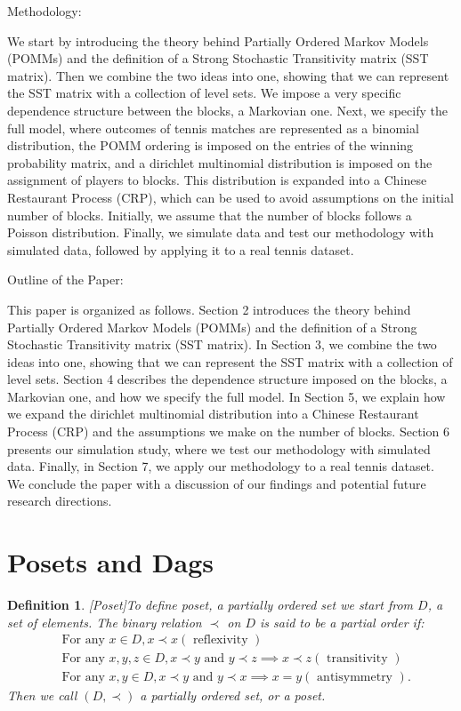 \documentclass[11pt]{amsart}
\newtheorem{definition}{Definition}
\begin{document}
Methodology:

We start by introducing the theory behind Partially Ordered Markov Models (POMMs) and the definition of a Strong Stochastic Transitivity matrix (SST matrix). Then we combine the two ideas into one, showing that we can represent the SST matrix with a collection of level sets. We impose a very specific dependence structure between the blocks, a Markovian one. Next, we specify the full model, where outcomes of tennis matches are represented as a binomial distribution, the POMM ordering is imposed on the entries of the winning probability matrix, and a dirichlet multinomial distribution is imposed on the assignment of players to blocks. This distribution is expanded into a Chinese Restaurant Process (CRP), which can be used to avoid assumptions on the initial number of blocks. Initially, we assume that the number of blocks follows a Poisson distribution. Finally, we simulate data and test our methodology with simulated data, followed by applying it to a real tennis dataset.

Outline of the Paper:

This paper is organized as follows. Section 2 introduces the theory behind Partially Ordered Markov Models (POMMs) and the definition of a Strong Stochastic Transitivity matrix (SST matrix). In Section 3, we combine the two ideas into one, showing that we can represent the SST matrix with a collection of level sets. Section 4 describes the dependence structure imposed on the blocks, a Markovian one, and how we specify the full model. In Section 5, we explain how we expand the dirichlet multinomial distribution into a Chinese Restaurant Process (CRP) and the assumptions we make on the number of blocks. Section 6 presents our simulation study, where we test our methodology with simulated data. Finally, in Section 7, we apply our methodology to a real tennis dataset. We conclude the paper with a discussion of our findings and potential future research directions.




\newpage
\section{Posets and Dags}
\begin{definition}\label{def:Poset}[Poset]To define poset, a partially ordered set we start from $D$, a set of elements. The binary relation $\prec$ on $D$ is said to be a partial order if:
\begin{align}
&\text{For any } x \in D, x \prec x (\text{ reflexivity }) \\
&\text{For any } x,y,z \in D, x \prec y \text{ and } y \prec z \implies x \prec z (\text{ transitivity }) \\
&\text{For any } x, y \in D, x \prec y \text{ and } y \prec x \implies x = y (\text{ antisymmetry }).
\end{align}
Then we call $(D, \prec)$ a partially ordered set, or a \textit{poset}. 
\end{definition}
\end{document}
